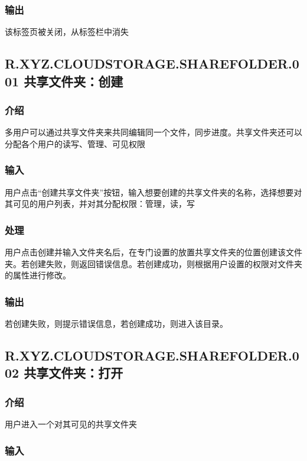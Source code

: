 \subsubsection{输出}
该标签页被关闭，从标签栏中消失

\subsection{R.XYZ.CLOUDSTORAGE.SHAREFOLDER.001 共享文件夹：创建}

\subsubsection{介绍}

多用户可以通过共享文件夹来共同编辑同一个文件，同步进度。共享文件夹还可以分配各个用户的读写、管理、可见权限

\subsubsection{输入} 

用户点击“创建共享文件夹”按钮，输入想要创建的共享文件夹的名称，选择想要对其可见的用户列表，并对其分配权限：管理，读，写

\subsubsection{处理} 

用户点击创建并输入文件夹名后，在专门设置的放置共享文件夹的位置创建该文件夹。若创建失败，则返回错误信息。若创建成功，则根据用户设置的权限对文件夹的属性进行修改。

\subsubsection{输出} 

若创建失败，则提示错误信息，若创建成功，则进入该目录。


\subsection{R.XYZ.CLOUDSTORAGE.SHAREFOLDER.002 共享文件夹：打开}

\subsubsection{介绍}

用户进入一个对其可见的共享文件夹

\subsubsection{输入} 

